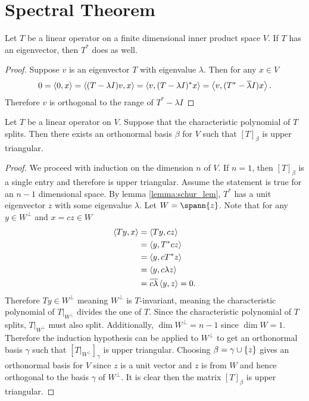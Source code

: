 \documentclass{subfiles}
\begin{document}
\chapter{Spectral Theorem}

\begin{lemma}
    \label{lemma:schur_lem}
    Let $T$ be a linear operator on a finite dimensional inner product space $V$. If $T$ has an eigenvector, then $T^*$ does as well.
\end{lemma}

\begin{proof}
    Suppose $v$ is an eigenvector $T$ with eigenvalue $\lambda$. Then for any $x \in V$
    \[
        0 = \left\langle 0, x \right\rangle = \left\langle (T - \lambda I)v, x \right\rangle = \left\langle v, (T - \lambda I)^* x \right\rangle = \left\langle v, (T^* - \overline{\lambda} I)x \right\rangle
    .\]
    Therefore $v$ is orthogonal to the range of $T^* - \lambda I$
\end{proof}

\begin{theorem}
    \label{thm:schurs}
    Let $T$ be a linear operator on $V$. Suppose that the characteristic polynomial of $T$ splits. Then there exists an orthonormal basis $\beta$ for $V$ such that $[T]_{\beta}$ is upper triangular.
\end{theorem}

\begin{proof}
    We proceed with induction on the dimension $n$ of $V$. If $n = 1$, then $[T]_\beta$ is a single entry and therefore is upper triangular. Assume the statement is true for an $n-1$ dimensional space. By lemma \ref{lemma:schur_lem}, $T^*$ has a unit eigenvector $z$ with some eigenvalue $\lambda$. Let $W = \spann\qty{z}$. Note that for any $y \in W^\perp$ and $x = cz \in W$
    \begin{align*}
        \left\langle Ty, x \right\rangle &= \left\langle Ty,cz \right\rangle \\
                     &= \left\langle y, T^* cz \right\rangle \\
                     &= \left\langle y, c T^* z \right\rangle \\
                     &= \left\langle y, c \lambda z \right\rangle \\
                     &= \overline{c \lambda} \left\langle y, z \right\rangle = 0.
    \end{align*}
    Therefore $Ty \in W^\perp$ meaning $W^\perp$ is $T$-invariant, meaning the characteristic polynomial of $T \vert_{W^\perp}$ divides the one of $T$. Since the characteristic polynomial of $T$ splits, $T \vert_{W^\perp}$ must also split. Additionally, $\dim W^\perp = n - 1$ since $\dim W = 1$. Therefore the induction hypothesis can be applied to $W^\perp$ to get an orthonormal basis $\gamma$ such that $[T \vert_{W^\perp}]_{\gamma}$ is upper triangular. Choosing $\beta = \gamma \cup \qty{z}$ gives an orthonormal basis for $V$ since $z$ is a unit vector and $z$ is from $W$ and hence orthogonal to the basis $\gamma$ of $W^\perp$. It is clear then the matrix $[T]_\beta$ is upper triangular.
\end{proof}
\end{document}
